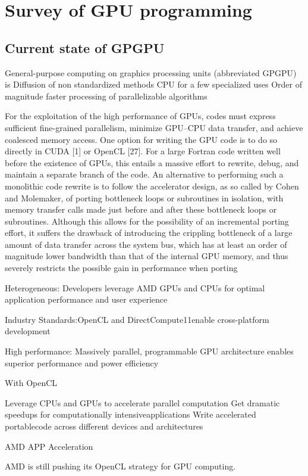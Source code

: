 \chapter{Survey of GPU programming}
\section{Current state of GPGPU}
General-purpose computing on graphics processing units (abbreviated GPGPU) is	Diffusion of non standardized methods 	CPU for a few specialized uses 	Order of magnitude faster processing of parallelizable algorithms

For the exploitation of the high performance of GPUs, codes must express sufficient fine-grained parallelism, minimize GPU–CPU data transfer, and achieve coalesced memory access. One option for writing the GPU code is to do so directly in CUDA [1] or OpenCL [27]. For a large Fortran code written well before the existence of GPUs, this entails a massive effort to rewrite, debug, and maintain a separate branch of the code. An alternative to performing such a monolithic code rewrite is to follow the accelerator design, as so called by Cohen and Molemaker, of porting bottleneck loops or subroutines in isolation, with memory transfer calls made just before and after these bottleneck loops or subroutines. Although this allows for the possibility of an incremental porting effort, it suffers the drawback of introducing the crippling bottleneck of a large amount of data transfer across the system bus, which has at least an order of magnitude lower bandwidth than that of the internal GPU memory, and thus severely restricts the possible gain in performance when porting

Heterogeneous: Developers leverage AMD GPUs and CPUs for optimal application performance and user experience

Industry Standards:OpenCL and DirectCompute11enable cross-platform development

High performance: Massively parallel, programmable GPU architecture enables superior performance and power efficiency

With OpenCL

Leverage CPUs and GPUs to accelerate parallel computation
Get dramatic speedups for computationally intensiveapplications
Write accelerated portablecode across different devices and architectures


AMD APP Acceleration 


AMD is still pushing its OpenCL strategy for GPU computing. 

